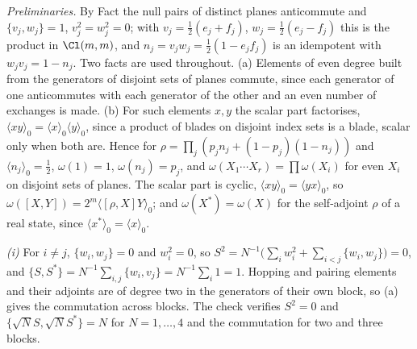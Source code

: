 \emph{Preliminaries.} By Fact  the null pairs of distinct planes anticommute and $\{v_{j}, w_{j}\} = 1$, $v_{j}^{2} = w_{j}^{2} = 0$; with $v_{j} = \tfrac12(e_{j} + f_{j})$, $w_{j} = \tfrac12(e_{j} - f_{j})$ this is the product in $\Cl(m,m)$, and $n_{j} = v_{j}w_{j} = \tfrac12(1 - e_{j}f_{j})$ is an idempotent with $w_{j}v_{j} = 1 - n_{j}$. Two facts are used throughout. (a) Elements of even degree built from the generators of disjoint sets of planes commute, since each generator of one anticommutes with each generator of the other and an even number of exchanges is made. (b) For such elements $x, y$ the scalar part factorises, $\langle xy\rangle_{0} = \langle x\rangle_{0}\langle y\rangle_{0}$, since a product of blades on disjoint index sets is a blade, scalar only when both are. Hence for $\rho = \prod_{j}(p_{j}n_{j} + (1 - p_{j})(1 - n_{j}))$ and $\langle n_{j}\rangle_{0} = \tfrac12$, $\omega(1) = 1$, $\omega(n_{j}) = p_{j}$, and $\omega(X_{1}\cdots X_{r}) = \prod\omega(X_{i})$ for even $X_{i}$ on disjoint sets of planes. The scalar part is cyclic, $\langle xy\rangle_{0} = \langle yx\rangle_{0}$, so $\omega([X, Y]) = 2^{m}\langle[\rho, X]Y\rangle_{0}$; and $\omega(X^{*}) = \omega(X)$ for the self-adjoint $\rho$ of a real state, since $\langle x^{*}\rangle_{0} = \langle x\rangle_{0}$.

\emph{(i)} For $i \ne j$, $\{w_{i}, w_{j}\} = 0$ and $w_{i}^{2} = 0$, so $S^{2} = N^{-1}\big(\sum_{i}w_{i}^{2} + \sum_{i<j}\{w_{i}, w_{j}\}\big) = 0$, and $\{S, S^{*}\} = N^{-1}\sum_{i,j}\{w_{i}, v_{j}\} = N^{-1}\sum_{i}1 = 1$. Hopping and pairing elements and their adjoints are of degree two in the generators of their own block, so (a) gives the commutation across blocks. The check verifies $S^{2} = 0$ and $\{\sqrt{N}S, \sqrt{N}S^{*}\} = N$ for $N = 1, \dots, 4$ and the commutation for two and three blocks.

